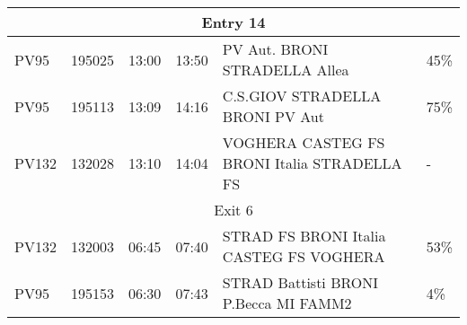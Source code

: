 \begin{landscape}
\begin{table}[ht]
\begin{tabular}{|llllll|}
\multicolumn{6}{|c|}{Entry 14}                                                                                                                                                                                                                                                                                                                                                            \\ \hline
\multicolumn{1}{|l|}{PV95}          & \multicolumn{1}{l|}{195025}                                    & \multicolumn{1}{l|}{13:00}                                            & \multicolumn{1}{l|}{13:50}                                        & \multicolumn{1}{l|}{PV Aut.   BRONI   STRADELLA Allea}                    & 45\%                                                       \\ \hline
\multicolumn{1}{|l|}{PV95}          & \multicolumn{1}{l|}{195113}                                    & \multicolumn{1}{l|}{13:09}                                            & \multicolumn{1}{l|}{14:16}                                        & \multicolumn{1}{l|}{C.S.GIOV   STRADELLA   BRONI   PV Aut}                & 75\%                                                       \\ \hline
\multicolumn{1}{|l|}{PV132}         & \multicolumn{1}{l|}{132028}                                    & \multicolumn{1}{l|}{13:10}                                            & \multicolumn{1}{l|}{14:04}                                        & \multicolumn{1}{l|}{VOGHERA   CASTEG FS   BRONI Italia     STRADELLA FS}  & -                                                          \\ \hline
\multicolumn{6}{|c|}{Exit 6}                                                                                                                                                                                                                                                                                                                                                              \\ \hline
\multicolumn{1}{|l|}{PV132}         & \multicolumn{1}{l|}{132003}                                    & \multicolumn{1}{l|}{06:45}                                            & \multicolumn{1}{l|}{07:40}                                        & \multicolumn{1}{l|}{STRAD FS   BRONI Italia   CASTEG FS     VOGHERA}      & 53\%                                                       \\ \hline
\multicolumn{1}{|l|}{PV95}          & \multicolumn{1}{l|}{195153}                                    & \multicolumn{1}{l|}{06:30}                                            & \multicolumn{1}{l|}{07:43}                                        & \multicolumn{1}{l|}{STRAD Battisti   BRONI   P.Becca   MI FAMM2}          & 4\%                                                        \\ \hline

\end{tabular}
\end{table}
\end{landscape}
